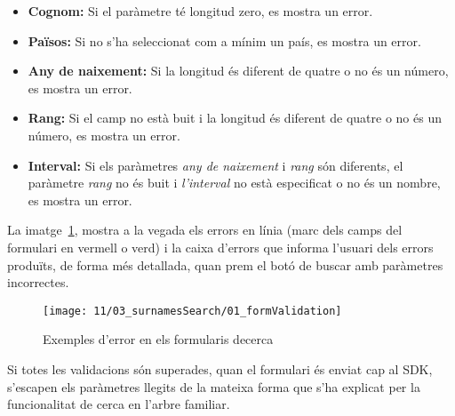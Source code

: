 \begin{itemize}
    \item \textbf{Cognom:} Si el paràmetre té longitud zero, es mostra un error.
    \item \textbf{Països:} Si no s'ha seleccionat com a mínim un país, es mostra un error.
    \item \textbf{Any de naixement:} Si la longitud és diferent de quatre o no és un número, es mostra un error.
    \item \textbf{Rang:} Si el camp no està buit i la longitud és diferent de quatre o no és un número, es mostra un error.
    \item \textbf{Interval:} Si els paràmetres \emph{any de naixement} i \emph{rang} són diferents, el paràmetre \emph{rang} no és buit i \emph{l’interval} no està especificat o no és un nombre, es mostra un error.
\end{itemize}

La imatge~\ref{fig:surnamesError}, mostra a la vegada els errors en línia (marc dels camps del formulari en vermell o verd) i la caixa d'errors que informa l'usuari dels errors produïts, de forma més detallada, quan prem el botó de buscar amb paràmetres incorrectes.

\begin{figure}[h]
    \texttt{[image: 11/03\_surnamesSearch/01\_formValidation]}
    \centering
    \caption{Exemples d'error en els formularis decerca}\label{fig:surnamesError}
\end{figure}

Si totes les validacions són superades, quan el formulari és enviat cap al SDK, s'escapen els paràmetres llegits de la mateixa forma que s'ha explicat per la funcionalitat de cerca en l’arbre familiar.
